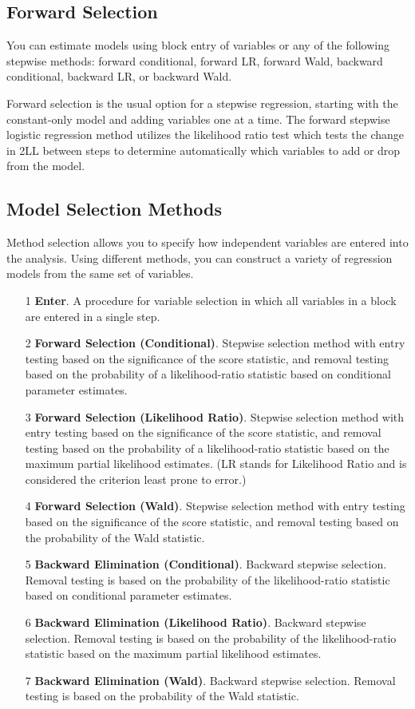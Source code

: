 \documentclass[a4paper,12pt]{article}
\begin{document}
\subsection{Forward Selection}
You can estimate models using block entry of variables or any of the following stepwise
methods: forward conditional, forward LR, forward Wald, backward conditional, backward
LR, or backward Wald.


Forward selection is the usual option for a stepwise regression,
starting with the constant-only model and adding variables one at a time. The forward
stepwise logistic regression method utilizes the likelihood ratio test which tests the change in 2LL between steps to determine automatically which variables to add or drop from the model.

\subsection*{Model Selection Methods}
Method selection allows you to specify how independent variables are entered into the analysis.
Using different methods, you can construct a variety of regression models from the same set of
variables.

\begin{itemize}
	\item[1] \textbf{Enter}. A procedure for variable selection in which all variables in a block are entered in a
	single step.
	\item[2] \textbf{Forward Selection (Conditional)}. Stepwise selection method with entry testing based on
	the significance of the score statistic, and removal testing based on the probability of a
	likelihood-ratio statistic based on conditional parameter estimates.
	\item[3] \textbf{Forward Selection (Likelihood Ratio)}. Stepwise selection method with entry testing based
	on the significance of the score statistic, and removal testing based on the probability of a
	likelihood-ratio statistic based on the maximum partial likelihood estimates.  (LR stands for Likelihood Ratio and  is considered the criterion least prone to error.)
	\item[4] \textbf{Forward Selection (Wald)}. Stepwise selection method with entry testing based on the
	significance of the score statistic, and removal testing based on the probability of the Wald
	statistic.
	\item[5] \textbf{Backward Elimination (Conditional)}. Backward stepwise selection. Removal testing is based on
	the probability of the likelihood-ratio statistic based on conditional parameter estimates.
	\item[6] \textbf{Backward Elimination (Likelihood Ratio)}. Backward stepwise selection. Removal testing
	is based on the probability of the likelihood-ratio statistic based on the maximum partial
	likelihood estimates.
	\item[7] \textbf{Backward Elimination (Wald)}. Backward stepwise selection. Removal testing is based on the
	probability of the Wald statistic.
\end{itemize}
\end{document}
